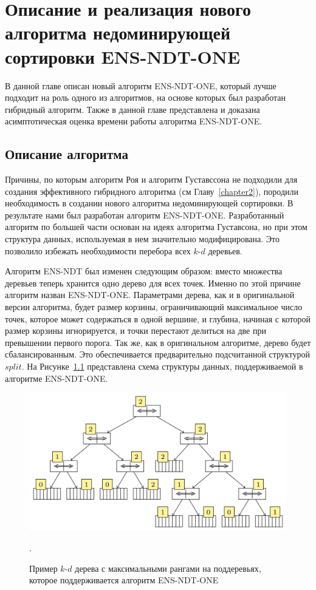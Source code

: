 \chapter{Описание и реализация нового алгоритма недоминирующей сортировки ENS-NDT-ONE}
\label{chapter3}

В данной главе описан новый алгоритм ENS-NDT-ONE, который лучше подходит на роль одного из алгоритмов, на основе которых был разработан гибридный алгоритм. Также в данной главе представлена и доказана асимптотическая оценка времени работы алгоритма ENS-NDT-ONE.

\section{Описание алгоритма}

Причины, по которым алгоритм Роя и алгоритм Густавссона не подходили для создания эффективного гибридного алгоритма (см Главу~\ref{chapter2}), породили необходимость в создании нового алгоритма недоминирующей сортировки. В результате нами был разработан алгоритм ENS-NDT-ONE. Разработанный алгоритм по большей части основан на идеях алгоритма Густавсона, но при этом структура данных, используемая в нем значительно модифицирована. Это позволило избежать необходимости перебора всех $k$-$d$ деревьев.

Алгоритм ENS-NDT был изменен следующим образом: вместо множества деревьев теперь хранится одно дерево для всех точек. Именно по этой причине алгоритм назван ENS-NDT-ONE. Параметрами дерева, как и в оригинальной версии алгоритма, будет размер корзины, ограничивающий максимальное число точек, которое может содержаться в одной вершине, и глубина, начиная с которой размер корзины игнорируется, и точки перестают делиться на две при превышении первого порога. Так же, как в оригинальном алгоритме, дерево будет сбалансированным. Это обеспечивается предварительно подсчитанной структурой $split$. На Рисунке~\ref{ndtree_new} представлена схема структуры данных, поддерживаемой в алгоритме ENS-NDT-ONE.

\begin{figure}[!h]
\begin{center}
\includegraphics[width=15cm]{pic/ndtree_new.png}
\caption{Пример $k$-$d$ дерева с максимальными рангами на поддеревьях, которое поддерживается алгоритм ENS-NDT-ONE}.
\label{ndtree_new}
\end{center}
\end{figure}

